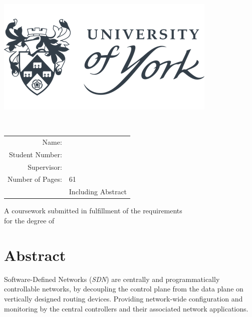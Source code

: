 \documentclass[12pt, oneside]{book}
\begin{document}
%
%
\begin{titlepage}
\begin{center}

	\includegraphics[scale=0.5]{images/UniOfYorkLogo.png}


	\vfill

			{\huge \thesisTitle \\}

	\vfill

	\begin{tabular}{rl}
	Name: & \authorName \\
	Student Number: & \studentNumber \\
	Supervisor: & \supervisor \\
	Number of Pages: & 61\\
	& Including Abstract
	\end{tabular}
	\vfill

	A coursework submitted in fulfillment of the requirements\\ for the degree of \degreeTitle
	\vfill
	\deptName
	\vfill
	\academicYear
\end{center}

\end{titlepage}
\newpage


\newpage



\pagestyle{fancy}
\rhead{\authorName}
\lhead{\nouppercase{\leftmark}}
\lfoot{\empty}
\cfoot{\thepage}
\rfoot{\empty}

\frontmatter
\chapter{Abstract}
Software-Defined Networks (\emph{SDN}) are centrally and programmatically controllable networks, by decoupling
the control plane from the data plane on vertically designed routing devices.
Providing network-wide configuration and monitoring by the central
controllers and their associated network applications.
\end{document}
